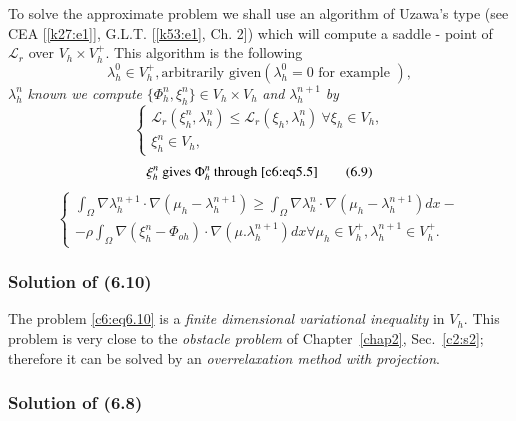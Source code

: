   To solve the approximate problem we shall use an algorithm of Uzawa's 
  type (see CEA [\ref{k27:e1}], G.L.T. [\ref{k53:e1}, Ch. 2]) which will compute
  a saddle -  
  point of $\mathscr{L}_r $ over $V_h \times V^+_h$. This algorithm is 
  the following    
 \begin{equation}
\lambda^0_h \in V^+_h, \text{arbitrarily given}(\lambda^0_h =0 
\text{ for example }),\tag{6.7}\label{c6:eq6.7} 
 \end{equation} 
 $\lambda^n_h$ \textit{known we compute} $\{ \Phi^n_h, \xi^n_h \} 
 \in V_h \times V_h$ \textit{and} $\lambda^{n+1}_h$ \textit{by}  
\begin{equation}
\begin{cases}
\mathscr{L}_r (\xi^n_h, \lambda^n_h) \leq \mathscr{L}_r (\xi_h, 
\lambda^n_h) ~ \forall \xi_h \in V_h, \\ 
\xi^n_h \in V_h, 
\end{cases}
\tag{6.8}\label{c6:eq6.8} 
\end{equation}
\begin{equation}
\xi^n_h \text{ gives } \Phi^n_h \text{ through } \eqref{c6:eq5.5} 
\tag{6.9}\label{c6:eq6.9} 
\end{equation}
\begin{equation}
\begin{cases}
\int_\Omega \nabla \lambda^{n +1}_h \cdot \nabla (\mu_h - 
\lambda^{n+1}_h) \geq \int_\Omega \nabla \lambda^n_h \cdot 
\nabla (\mu_h - \lambda^{n+1}_h) dx -\\  
-\rho \int_\Omega \nabla (\xi^n_h - \Phi_{oh}) \cdot 
\nabla (\mu. \lambda^{n+1}_h) dx \forall \mu_h \in V^+_h, 
\lambda^{n+1}_h \in V^+_h.  
\end{cases}
\tag{6.10}\label{c6:eq6.10}
\end{equation}

\subsubsection{Solution of (6.10)}\label{c6:sss6.3.2}%

The problem \eqref{c6:eq6.10} is a \textit{finite dimensional 
variational inequality} in $V_h$. This problem is very close to the 
\textit{obstacle problem} of Chapter~\ref{chap2}, Sec.~\ref{c2:s2}; 
therefore it can be  solved by an \textit{overrelaxation method with 
projection}.      

\subsubsection{Solution of (6.8)}\label{c6:sss6.3.3}

